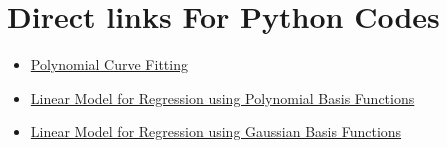 \section{Direct links For Python Codes}

\begin{itemize}
    \item \href{https://drive.google.com/file/d/1mxY9pXO8wiZVVD0q3yLTu1v4Fx4q6NzI/view?usp=sharing}{Polynomial Curve Fitting}
    \item \href{https://drive.google.com/file/d/1nWiG9Q4ry0lCtlhq9HL9ZXIbecmPnXi5/view?usp=sharing}{Linear Model for Regression using Polynomial Basis Functions}
    \item \href{https://drive.google.com/file/d/1zqY76i_a3TWYNmjPhV_a--PqXhK_LwDk/view?usp=sharing}{Linear Model for Regression using Gaussian Basis Functions}
\end{itemize}